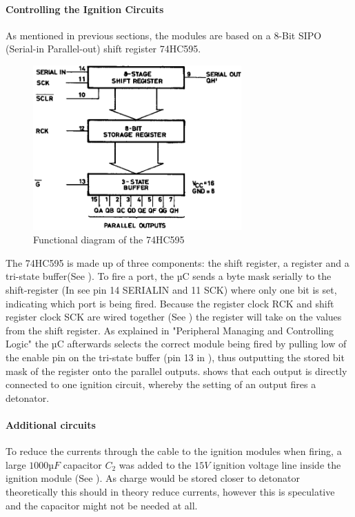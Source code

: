 \pagebreak

\paragraph{Controlling the Ignition Circuits}
As mentioned in previous sections, the modules are based on a 8-Bit SIPO (Serial-in Parallel-out) shift register 74HC595. 

\begin{figure}[!ht]
    \centering
    \includegraphics[width=8cm]{./Figures/75hc595.png}
    \caption{Functional diagram of the 74HC595}
    \label{fig:75hc595}     
\end{figure}


\noindent The 74HC595 is made up of three components: the shift register, a register and a tri-state buffer(See ). To fire a port, the µC sends a byte mask serially to the shift-register (In  see pin 14 SERIALIN and 11 SCK) where only one bit is set, indicating which port is being fired. Because the register clock RCK and shift register clock SCK are wired together (See ) the register will take on the values from the shift register. As explained in  "Peripheral Managing and Controlling Logic" the µC afterwards selects the correct module being fired by pulling low of the enable pin on the tri-state buffer (pin 13 in ), thus outputting the stored bit mask of the register onto the parallel outputs.  shows that each output is directly connected to one ignition circuit, whereby the setting of an output fires a detonator.\\

\paragraph{Additional circuits}
To reduce the currents through the cable to the ignition modules when firing, a large $1000µF$ capacitor $C_2$ was added to the $15V$ ignition voltage line inside the ignition module (See ). As charge would be stored closer to detonator theoretically this should in theory reduce currents, however this is speculative and the capacitor might not be needed at all.\\


